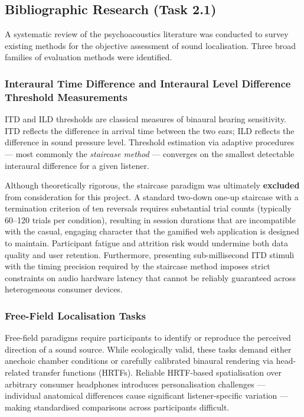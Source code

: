\subsection{Bibliographic Research (Task 2.1)}

A systematic review of the psychoacoustics literature was conducted to survey existing
methods for the objective assessment of sound localisation. Three broad families of
evaluation methods were identified.

\subsubsection{Interaural Time Difference and Interaural Level Difference Threshold Measurements}

ITD and ILD thresholds are classical measures of binaural hearing sensitivity.
ITD reflects the difference in arrival time between the two ears; ILD reflects the
difference in sound pressure level. Threshold estimation via adaptive procedures —
most commonly the \textit{staircase method} — converges on the smallest detectable
interaural difference for a given listener.

Although theoretically rigorous, the staircase paradigm was ultimately
\textbf{excluded} from consideration for this project. A standard two-down one-up
staircase with a termination criterion of ten reversals requires substantial trial
counts (typically 60–120 trials per condition), resulting in session durations that
are incompatible with the casual, engaging character that the gamified web application
is designed to maintain. Participant fatigue and attrition risk would undermine both
data quality and user retention. Furthermore, presenting sub-millisecond ITD stimuli
with the timing precision required by the staircase method imposes strict constraints
on audio hardware latency that cannot be reliably guaranteed across heterogeneous
consumer devices.

\subsubsection{Free-Field Localisation Tasks}

Free-field paradigms require participants to identify or reproduce the perceived
direction of a sound source. While ecologically valid, these tasks demand either
anechoic chamber conditions or carefully calibrated binaural rendering via
head-related transfer functions (HRTFs). Reliable HRTF-based spatialisation over
arbitrary consumer headphones introduces personalisation challenges — individual
anatomical differences cause significant listener-specific variation — making
standardised comparisons across participants difficult.

